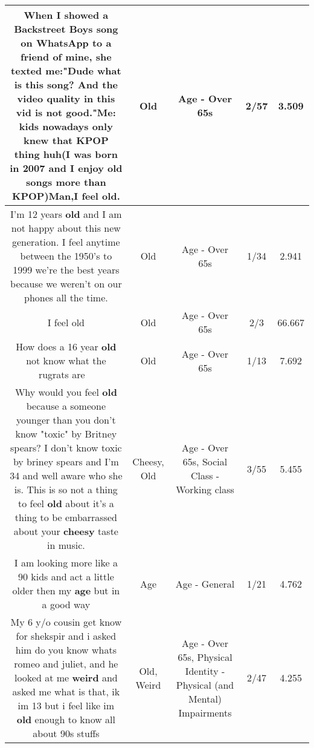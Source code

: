 \documentclass[11pt]{article}
\newlength\mylength
\begin{document}
\begin{center}
\begin{longtable}{|C{.65\mylength}|C{.30\mylength}|C{.12\mylength}|C{.12\mylength}|C{.12\mylength}|}
  \small When I showed a Backstreet Boys song on WhatsApp to a friend of mine, she texted me:"Dude what is this song? And the video quality in this vid is not good."Me: kids nowadays only knew that KPOP thing huh(I was born in 2007 and I enjoy \textbf{old} songs more than KPOP)Man,I feel \textbf{old}.\normalsize   & Old & Age - Over 65s & 2/57 & 3.509 \\  \hline
  \small I'm 12 years \textbf{old} and I am not happy about this new generation. I feel anytime between the 1950's to 1999 we're the best years because we weren't on our phones all the time.\normalsize   & Old & Age - Over 65s & 1/34 & 2.941 \\  \hline
  \small I feel old\normalsize   & Old & Age - Over 65s & 2/3 & 66.667 \\  \hline
  \small How does a 16 year \textbf{old} not know what the rugrats are 🤔😔\normalsize   & Old & Age - Over 65s & 1/13 & 7.692 \\  \hline
  \small Why would you feel \textbf{old} because a someone younger than you don't know "toxic" by Britney spears? I don't know toxic by briney spears and I'm 34 and well aware who she is. This is so not a thing to feel \textbf{old} about it's a thing to be embarrassed about your \textbf{cheesy} taste in music.\normalsize   & Cheesy, Old & Age - Over 65s, Social Class - Working class & 3/55 & 5.455 \\  \hline
  \small I am looking more like a 90 kids and act a little older then my \textbf{age} but in a good way\normalsize   & Age & Age - General & 1/21 & 4.762 \\  \hline
  \small My 6 y/o cousin get know for shekspir and i asked him do you know whats romeo and juliet, and he looked at me \textbf{weird} and asked me what is that, ik im 13 but i feel like im \textbf{old} enough to know all about 90s stuffs\normalsize   & Old, Weird & Age - Over 65s, Physical Identity - Physical (and Mental) Impairments & 2/47 & 4.255 \\  \hline

\end{longtable}
\end{center}
\end{document}
